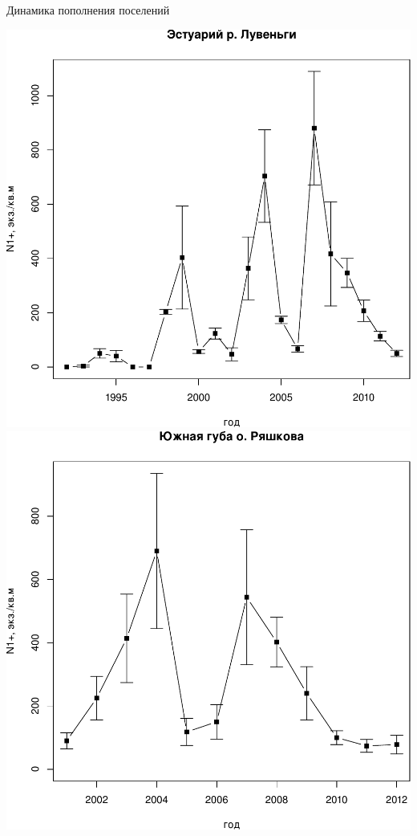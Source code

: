 \documentclass{beamer}
\begin{document}
\begin{frame}{Динамика пополнения поселений}
	\begin{minipage}[t]{.45\linewidth}
\begin{center}
			\includegraphics[height=.45\textheight]{Estuary_N_oneyear.pdf}\\
			\includegraphics[height=.45\textheight]{YuG_N_oneyear.pdf}

\end{center}
\end{minipage}
\end{frame}
\end{document}
